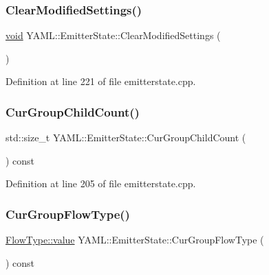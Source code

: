 \subsubsection{\texorpdfstring{ClearModifiedSettings()}{ClearModifiedSettings()}}
{\footnotesize\ttfamily \mbox{\hyperlink{glad_8h_a950fc91edb4504f62f1c577bf4727c29}{void}} Y\+A\+M\+L\+::\+Emitter\+State\+::\+Clear\+Modified\+Settings (\begin{DoxyParamCaption}{ }\end{DoxyParamCaption})}



Definition at line 221 of file emitterstate.\+cpp.

\mbox{\label{class_y_a_m_l_1_1_emitter_state_ae4ef4ccea608131c01161fd2cf6891e5}} 
\subsubsection{\texorpdfstring{CurGroupChildCount()}{CurGroupChildCount()}}
{\footnotesize\ttfamily std\+::size\+\_\+t Y\+A\+M\+L\+::\+Emitter\+State\+::\+Cur\+Group\+Child\+Count (\begin{DoxyParamCaption}{ }\end{DoxyParamCaption}) const}



Definition at line 205 of file emitterstate.\+cpp.

\mbox{\label{class_y_a_m_l_1_1_emitter_state_aa40ed6d18f1ea70244e8c7d7a6a65ce4}} 
\subsubsection{\texorpdfstring{CurGroupFlowType()}{CurGroupFlowType()}}
{\footnotesize\ttfamily \mbox{\hyperlink{struct_y_a_m_l_1_1_flow_type_afc7b0fab097e599c9b49918739e1b5cc}{Flow\+Type\+::value}} Y\+A\+M\+L\+::\+Emitter\+State\+::\+Cur\+Group\+Flow\+Type (\begin{DoxyParamCaption}{ }\end{DoxyParamCaption}) const}



